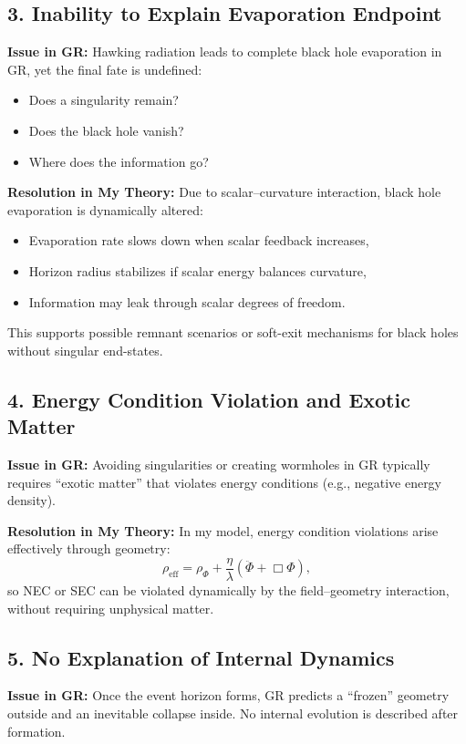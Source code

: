\documentclass[12pt]{article}
\begin{document}
\subsection{3. Inability to Explain Evaporation Endpoint}

\textbf{Issue in GR:}  
Hawking radiation leads to complete black hole evaporation in GR, yet the final fate is undefined:
\begin{itemize}
    \item Does a singularity remain?
    \item Does the black hole vanish?
    \item Where does the information go?
\end{itemize}

\textbf{Resolution in My Theory:}  
Due to scalar–curvature interaction, black hole evaporation is dynamically altered:
\begin{itemize}
    \item Evaporation rate slows down when scalar feedback increases,
    \item Horizon radius stabilizes if scalar energy balances curvature,
    \item Information may leak through scalar degrees of freedom.
\end{itemize}
This supports possible remnant scenarios or soft-exit mechanisms for black holes without singular end-states.

\subsection{4. Energy Condition Violation and Exotic Matter}

\textbf{Issue in GR:}  
Avoiding singularities or creating wormholes in GR typically requires “exotic matter” that violates energy conditions (e.g., negative energy density).

\textbf{Resolution in My Theory:}  
In my model, energy condition violations arise effectively through geometry:
\[
\rho_{\text{eff}} = \rho_\Phi + \frac{\eta}{\lambda} \left( \ddot{\Phi} + \Box \Phi \right),
\]
so NEC or SEC can be violated dynamically by the field–geometry interaction, without requiring unphysical matter.

\subsection{5. No Explanation of Internal Dynamics}

\textbf{Issue in GR:}  
Once the event horizon forms, GR predicts a “frozen” geometry outside and an inevitable collapse inside. No internal evolution is described after formation.
\end{document}
